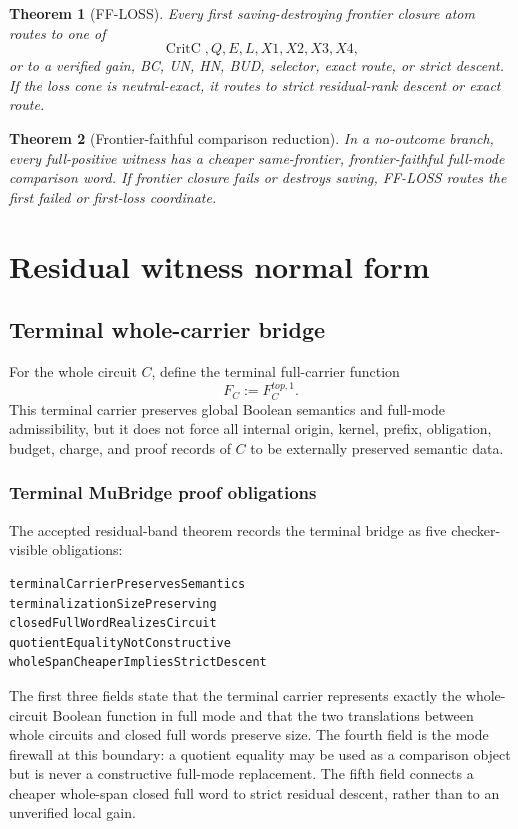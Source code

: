 \documentclass[10.5pt,a4paper]{article}
\newtheorem{theorem}{Theorem}[section]
\newcommand{\CritC}{\operatorname{CritC}}
\begin{document}
\begin{theorem}[FF-LOSS]
Every first saving-destroying frontier closure atom routes to one of
\[
\CritC,Q,E,L,X1,X2,X3,X4,
\]
or to a verified gain, BC, UN, HN, BUD, selector, exact route, or strict descent. If the loss cone is neutral-exact, it routes to strict residual-rank descent or exact route.
\end{theorem}

\begin{theorem}[Frontier-faithful comparison reduction]
In a no-outcome branch, every full-positive witness has a cheaper same-frontier, frontier-faithful full-mode comparison word. If frontier closure fails or destroys saving, FF-LOSS routes the first failed or first-loss coordinate.
\end{theorem}

\section{Residual witness normal form}

\subsection{Terminal whole-carrier bridge}
For the whole circuit \(C\), define the terminal full-carrier function
\[
F_C:=F_C^{top,1}.
\]
This terminal carrier preserves global Boolean semantics and full-mode admissibility, but it does not force all internal origin, kernel, prefix, obligation, budget, charge, and proof records of \(C\) to be externally preserved semantic data.

\subsubsection{Terminal MuBridge proof obligations}
The accepted residual-band theorem records the terminal bridge as five checker-visible obligations:
\begin{lstlisting}
terminalCarrierPreservesSemantics
terminalizationSizePreserving
closedFullWordRealizesCircuit
quotientEqualityNotConstructive
wholeSpanCheaperImpliesStrictDescent
\end{lstlisting}
The first three fields state that the terminal carrier represents exactly the whole-circuit Boolean function in full mode and that the two translations between whole circuits and closed full words preserve size.  The fourth field is the mode firewall at this boundary: a quotient equality may be used as a comparison object but is never a constructive full-mode replacement.  The fifth field connects a cheaper whole-span closed full word to strict residual descent, rather than to an unverified local gain.
\end{document}
